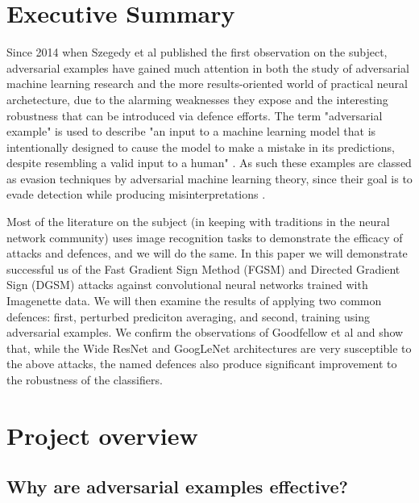 \documentclass[conference]{IEEEtran}
\begin{document}
\tableofcontents%

\bigskip

\section{Executive Summary}

Since 2014 when Szegedy et al \cite{szegedy2014intriguing} published the
first observation on the subject, adversarial examples have gained much
attention in both the study of adversarial machine learning research and the
more results-oriented world of practical neural archetecture, due to the
alarming weaknesses they expose and the interesting robustness that can be
introduced via defence efforts. The term "adversarial example" is used to
describe "an input to a machine learning model that is intentionally
designed to cause the model to make a mistake in its predictions, despite
resembling a valid input to a human" \cite{wiyatno2019adversarial}. As such
these examples are classed as evasion techniques by adversarial machine
learning theory, since their goal is to evade detection while producing
misinterpretations \cite{wiki:aml}.

Most of the literature on the subject (in keeping with traditions in the
neural network community) uses image recognition tasks to demonstrate the
efficacy of attacks and defences, and we will do the same. In this paper we
will demonstrate successful us of the Fast Gradient Sign Method (FGSM) \cite%
{goodfellow2014explaining} and Directed Gradient Sign (DGSM) \cite%
{madry2020adversarial} attacks against convolutional neural networks trained
with Imagenette data. We will then examine the results of applying two
common defences: first, perturbed prediciton averaging, and second, training
using adversarial examples. We confirm the observations of Goodfellow et al 
\cite{goodfellow2014explaining} and show that, while the Wide ResNet and
GoogLeNet architectures are very susceptible to the above attacks, the named
defences also produce significant improvement to the robustness of the
classifiers.

\section{Project overview}

\subsection{Why are adversarial examples effective?}
\end{document}
